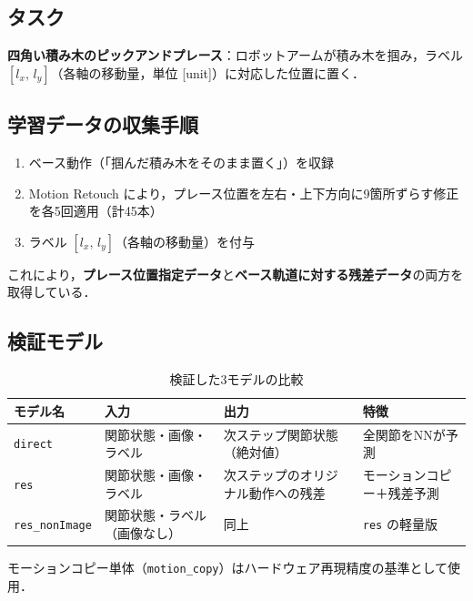 \documentclass[a4paper,10pt]{jlreq}
\newcommand{\figph}[2][0.72\linewidth]{%
  \begin{center}
    \fboxsep=6pt
    \fbox{\begin{minipage}{#1}%
      \centering\vspace{1.4cm}%
      \textcolor{gray}{\small [図：#2]}%
      \vspace{1.4cm}%
    \end{minipage}}
  \end{center}%
}
\begin{document}
\subsection{タスク}

\textbf{四角い積み木のピックアンドプレース}：ロボットアームが積み木を掴み，ラベル $[l_x,\,l_y]$（各軸の移動量，単位 [unit]）に対応した位置に置く．

\figph[0.58\linewidth]{実験タスクの概要図（9箇所のプレース位置と移動量ラベルの対応）}

\subsection{学習データの収集手順}

\begin{enumerate}
  \item ベース動作（「掴んだ積み木をそのまま置く」）を収録
  \item Motion Retouch により，プレース位置を左右・上下方向に9箇所ずらす修正を各5回適用（計45本）
  \item ラベル $[l_x,\,l_y]$（各軸の移動量）を付与
\end{enumerate}

これにより，\textbf{プレース位置指定データ}と\textbf{ベース軌道に対する残差データ}の両方を取得している．

\subsection{検証モデル}

\begin{table}[h]
  \centering\small
  \caption{検証した3モデルの比較}
  \begin{tabularx}{\linewidth}{lXXl}
    \toprule
    モデル名 & 入力 & 出力 & 特徴 \\
    \midrule
    \texttt{direct}        & 関節状態・画像・ラベル  & 次ステップ関節状態（絶対値） & 全関節をNNが予測 \\
    \texttt{res}           & 関節状態・画像・ラベル  & 次ステップのオリジナル動作への残差 & モーションコピー＋残差予測 \\
    \texttt{res\_nonImage} & 関節状態・ラベル（画像なし） & 同上 & \texttt{res} の軽量版 \\
    \bottomrule
  \end{tabularx}
\end{table}

モーションコピー単体（\texttt{motion\_copy}）はハードウェア再現精度の基準として使用．
\end{document}
